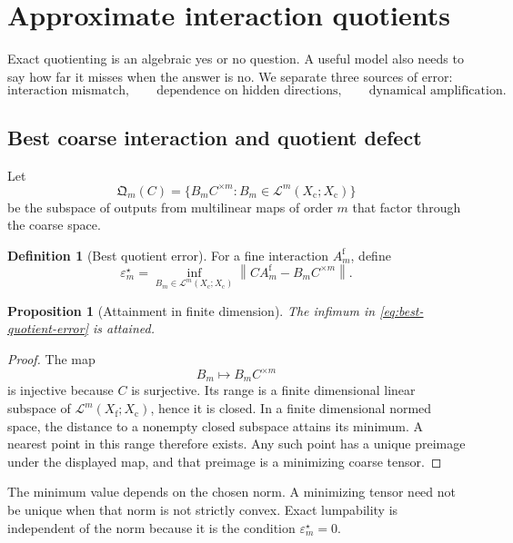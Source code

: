 \documentclass[11pt]{article}
\newtheorem{proposition}[theorem]{Proposition}
\theoremstyle{definition}
\newtheorem{definition}[theorem]{Definition}
\theoremstyle{remark}
\newcommand{\cL}{\mathcal L}
\newcommand{\norm}[1]{\left\lVert #1\right\rVert}
\newcommand{\fine}{\mathrm f}
\newcommand{\coarse}{\mathrm c}
\begin{document}
\section{Approximate interaction quotients}\label{sec:approx-dyn}

Exact quotienting is an algebraic yes or no question.  A useful model also needs to say how far it misses when the answer is no.  We separate three sources of error:
\[
  \text{interaction mismatch},
  \qquad
  \text{dependence on hidden directions},
  \qquad
  \text{dynamical amplification}.
\]

\subsection{Best coarse interaction and quotient defect}
Let
\[
  \mathfrak Q_m(C)
  =
  \{B_mC^{\times m}:B_m\in\cL^m(X_{\coarse};X_{\coarse})\}
\]
be the subspace of outputs from multilinear maps of order $m$ that factor through the coarse space.

\begin{definition}[Best quotient error]\label{def:best-quotient-error}
For a fine interaction $A_m^{\fine}$, define
\begin{equation}\label{eq:best-quotient-error}
  \varepsilon_m^\star
  =
  \inf_{B_m\in\cL^m(X_{\coarse};X_{\coarse})}
  \norm{CA_m^{\fine}-B_mC^{\times m}}.
\end{equation}
\end{definition}

\begin{proposition}[Attainment in finite dimension]\label{prop:best-quotient-attained}
The infimum in \eqref{eq:best-quotient-error} is attained.
\end{proposition}

\begin{proof}
The map
\[
  B_m\longmapsto B_mC^{\times m}
\]
is injective because $C$ is surjective.  Its range is a finite dimensional linear subspace of $\cL^m(X_{\fine};X_{\coarse})$, hence it is closed.  In a finite dimensional normed space, the distance to a nonempty closed subspace attains its minimum.  A nearest point in this range therefore exists.  Any such point has a unique preimage under the displayed map, and that preimage is a minimizing coarse tensor.
\end{proof}

The minimum value depends on the chosen norm.  A minimizing tensor need not be unique when that norm is not strictly convex.  Exact lumpability is independent of the norm because it is the condition $\varepsilon_m^\star=0$.
\end{document}
